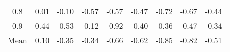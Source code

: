 \begin{longtable}{ | c || c | c | c | c | c | c | c || c |}
0.8 &  \cellcolor[HTML]{FFFFFF} 0.01 &  \cellcolor[HTML]{FFFFFF} -0.10 &  \cellcolor[HTML]{FFEFEF} -0.57 &  \cellcolor[HTML]{FFEFEF} -0.57 &  \cellcolor[HTML]{FFF7F7} -0.47 &  \cellcolor[HTML]{FFEFEF} -0.72 &  \cellcolor[HTML]{FFEFEF} -0.67 &  \cellcolor[HTML]{FFF7F7} -0.44 \\
0.9 &  \cellcolor[HTML]{F7F7FF} 0.44 &  \cellcolor[HTML]{FFEFEF} -0.53 &  \cellcolor[HTML]{FFFFFF} -0.12 &  \cellcolor[HTML]{FFE7E7} -0.92 &  \cellcolor[HTML]{FFF7F7} -0.40 &  \cellcolor[HTML]{FFF7F7} -0.36 &  \cellcolor[HTML]{FFF7F7} -0.47 &  \cellcolor[HTML]{FFF7F7} -0.34 \\
\hline
\hline
Mean  &  \cellcolor[HTML]{FFFFFF} 0.10 &  \cellcolor[HTML]{FFF7F7} -0.35 &  \cellcolor[HTML]{FFF7F7} -0.34 &  \cellcolor[HTML]{FFEFEF} -0.66 &  \cellcolor[HTML]{FFEFEF} -0.62 &  \cellcolor[HTML]{FFE7E7} -0.85 &  \cellcolor[HTML]{FFE7E7} -0.82 &  \cellcolor[HTML]{FFEFEF} -0.51 \\
\hline
\end{longtable}
